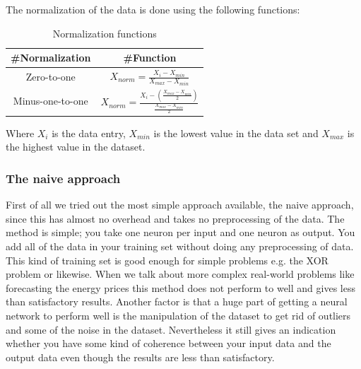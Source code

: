 The normalization of the data is done using the following functions:
\begin{table}[H]
\centering  %
\renewcommand{\arraystretch}{2}
\begin{tabular}{c c} %
 \#Normalization & \#Function \\ [0.5ex] %
\hline                  %
Zero-to-one & $ X_{norm} = \frac{X_i - X_{min}}{X_{max} - X_{min}}$ \\
Minus-one-to-one & $ X_{norm} = \frac{X_i - (\frac{X_{max} - X_{min}}{2})}{\frac{X_{max} - X_{min}}{2}}$ \\
[1ex]
\hline %
\end{tabular}
\caption{Normalization functions} %
\label{table:naiveTrainingApproach} %
\end{table}
Where $X_i$ is the data entry, $X_{min}$ is the lowest value in the data set and $X_{max}$ is the highest value in the dataset.

\subsubsection{The naive approach}
First of all we tried out the most simple approach available, the naive approach, since this has almost no overhead and takes no preprocessing of the data. The method is simple; you take one neuron per input and one neuron as output. You add all of the data in your training set without doing any preprocessing of data. This kind of training set is good enough for simple problems e.g. the XOR problem or likewise. When we talk about more complex real-world problems like forecasting the energy prices this method does not perform to well and gives less than satisfactory results. Another factor is that a huge part of getting a neural network to perform well is the manipulation of the dataset to get rid of outliers and some of the noise in the dataset. Nevertheless it still gives an indication whether you have some kind of coherence between your input data and the output data even though the results are less than satisfactory. 

